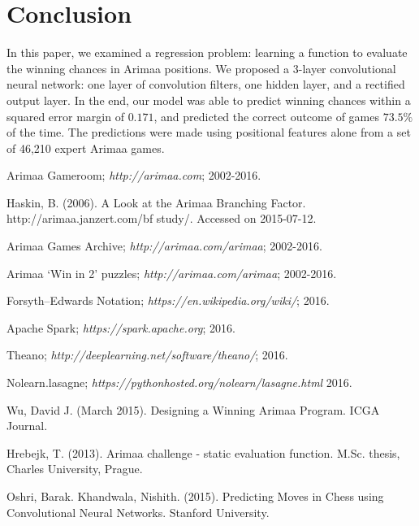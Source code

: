 \documentclass{article}
\begin{document}
\section{Conclusion}

In this paper, we examined a regression problem: learning a function to evaluate the winning chances in Arimaa positions.  We proposed a 3-layer convolutional neural network: one layer of convolution filters, one hidden layer, and a rectified output layer.  In the end, our model was able to predict winning chances within a squared error margin of $0.171$, and predicted the correct outcome of games $73.5\%$ of the time.  The predictions were made using positional features alone from a set of 46,210 expert Arimaa games.

\clearpage
\begin{thebibliography}{9}

Arimaa Gameroom;
\textit{http://arimaa.com};
2002-2016.

Haskin, B. (2006). A Look at the Arimaa Branching Factor. http://arimaa.janzert.com/bf study/. Accessed on 2015-07-12.

Arimaa Games Archive;
\textit{http://arimaa.com/arimaa};
2002-2016.

Arimaa `Win in 2' puzzles;
\textit{http://arimaa.com/arimaa};
2002-2016.

Forsyth--Edwards Notation;
\textit{https://en.wikipedia.org/wiki/};
2016.

Apache Spark;
\textit{https://spark.apache.org};
2016.

Theano;
\textit{http://deeplearning.net/software/theano/};
2016.

Nolearn.lasagne;
\textit{https://pythonhosted.org/nolearn/lasagne.html}
2016.

Wu, David J. (March 2015).
Designing a Winning Arimaa Program.
ICGA Journal.

Hrebejk, T. (2013). Arimaa challenge - static evaluation function. M.Sc. thesis, Charles University, Prague.

Oshri, Barak. Khandwala, Nishith. (2015).  Predicting Moves in Chess using Convolutional Neural Networks.  Stanford University.

\end{thebibliography}
\end{document}
